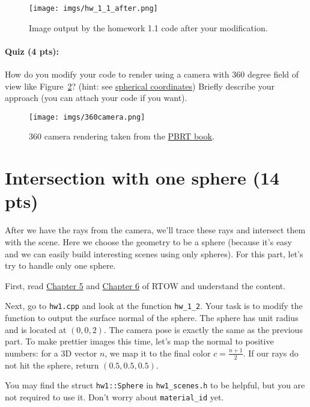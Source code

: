 \begin{figure}[ht]
    \centering
    \texttt{[image: imgs/hw\_1\_1\_after.png]}
    \caption{Image output by the homework 1.1 code after your modification.}
    \label{fig:hw_1_1_after}
\end{figure}

\paragraph{Quiz (4 pts):} How do you modify your code to render using a camera with 360 degree field of view like Figure~\ref{fig:360_camera}? (hint: see \href{https://en.wikipedia.org/wiki/Spherical_coordinate_system}{spherical coordinates}) Briefly describe your approach (you can attach your code if you want).
\begin{figure}[ht]
    \centering
    \texttt{[image: imgs/360camera.png]}
    \caption{360 camera rendering taken from the \href{https://www.pbr-book.org/3ed-2018/Camera_Models/Environment_Camera}{PBRT book}.}
    \label{fig:360_camera}
\end{figure}

\section{Intersection with one sphere (14 pts)}
After we have the rays from the camera, we'll trace these rays and intersect them with the scene. Here we choose the geometry to be a sphere (because it's easy and we can easily build interesting scenes using only spheres). For this part, let's try to handle only one sphere.

First, read \href{https://raytracing.github.io/books/RayTracingInOneWeekend.html\#addingasphere}{Chapter 5} and \href{https://raytracing.github.io/books/RayTracingInOneWeekend.html\#surfacenormalsandmultipleobjects}{Chapter 6} of RTOW and understand the content.

Next, go to \lstinline{hw1.cpp} and look at the function \lstinline{hw_1_2}. Your task is to modify the function to output the surface normal of the sphere. The sphere has unit radius and is located at $(0, 0, 2)$. The camera pose is exactly the same as the previous part. To make prettier images this time, let's map the normal to positive numbers: for a 3D vector $n$, we map it to the final color $c = \frac{n + 1}{2}$. If our rays do not hit the sphere, return $(0.5, 0.5, 0.5)$.

You may find the struct \lstinline{hw1::Sphere} in \lstinline{hw1_scenes.h} to be helpful, but you are not required to use it. Don't worry about \lstinline{material_id} yet.


